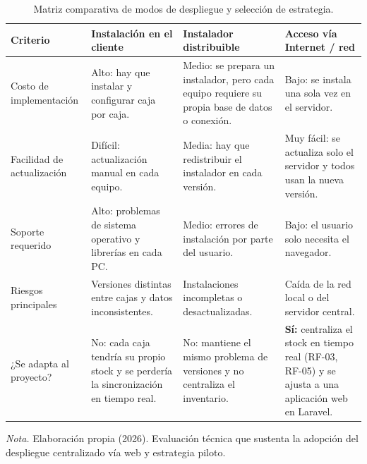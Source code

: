 \begin{table}[H]
  \centering
  \caption{Matriz comparativa de modos de despliegue y selección de estrategia.}
  \label{tab:despliegue_estrategia}
  \begin{tabularx}{\linewidth}{|>{\raggedright\arraybackslash}p{2.8cm}|>{\raggedright\arraybackslash}X|>{\raggedright\arraybackslash}X|>{\raggedright\arraybackslash}X|}
    \hline
    \textbf{Criterio} & \textbf{Instalación en el cliente} & \textbf{Instalador distribuible} & \textbf{Acceso vía Internet / red} \\ \hline
    Costo de implementación & Alto: hay que instalar y configurar caja por caja. & Medio: se prepara un instalador, pero cada equipo requiere su propia base de datos o conexión. & Bajo: se instala una sola vez en el servidor. \\ \hline
    Facilidad de actualización & Difícil: actualización manual en cada equipo. & Media: hay que redistribuir el instalador en cada versión. & Muy fácil: se actualiza solo el servidor y todos usan la nueva versión. \\ \hline
    Soporte requerido & Alto: problemas de sistema operativo y librerías en cada PC. & Medio: errores de instalación por parte del usuario. & Bajo: el usuario solo necesita el navegador. \\ \hline
    Riesgos principales & Versiones distintas entre cajas y datos inconsistentes. & Instalaciones incompletas o desactualizadas. & Caída de la red local o del servidor central. \\ \hline
    ¿Se adapta al proyecto? & No: cada caja tendría su propio stock y se perdería la sincronización en tiempo real. & No: mantiene el mismo problema de versiones y no centraliza el inventario. & \textbf{Sí:} centraliza el stock en tiempo real (RF-03, RF-05) y se ajusta a una aplicación web en Laravel. \\ \hline
  \end{tabularx}
  \par\vspace{0.2cm}
  {\raggedright \small \emph{Nota.} Elaboración propia (2026). Evaluación técnica que sustenta la adopción del despliegue centralizado vía web y estrategia piloto.\par}
\end{table}

